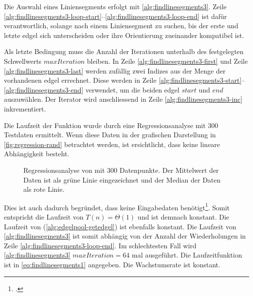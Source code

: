 Die Auswahl eines Liniensegments erfolgt mit \autoref{alg:findlinesegments3}. Zeile
 \ref{alg:findlinesegments3-loop-start}--\ref{alg:findlinesegments3-loop-end} ist dafür verantwortlich, solange nach
 einem Liniensegment zu suchen, bis der erste und letzte \gls{edgel} sich unterscheiden oder ihre Orientierung
 zueinander kompatibel ist.

Als letzte Bedingung muss die Anzahl der Iterationen unterhalb des festgelegten Schwellwerts $\mathit{maxIteration}$
 bleiben. In Zeile \ref{alg:findlinesegments3-first} und Zeile \ref{alg:findlinesegments3-last} werden zufällig zwei
 Indizes aus der Menge der vorhandenen \gls{edgel} errechnet. Diese werden in Zeile
 \ref{alg:findlinesegments3-start}--\ref{alg:findlinesegments3-end} verwendet, um die beiden \gls{edgel}
 $\mathit{start}$ und $\mathit{end}$ auszuwählen. Der Iterator wird anschliessend in Zeile
 \ref{alg:findlinesegments3-inc} inkrementiert.

Die Laufzeit der Funktion  wurde durch eine Regressionsanalyse mit $300$ Testdaten ermittelt. Wenn diese
 Daten in der grafischen Darstellung in \autoref{fig:regression-rand} betrachtet werden, ist ersichtlicht, dass keine
 lineare Abhängigkeit besteht.
\begin{figure}[!ht]
	\centering
	
	\caption{Regressionsanalyse von  mit $300$ Datenpunkte. Der Mittelwert der Daten ist als grüne Linie
	 eingezeichnet und der Median der Daten als rote Linie.}
	\label{fig:regression-rand}
\end{figure}
Dies ist auch dadurch begründet, dass  keine Eingabedaten benötigt\footcite[Vgl.][]{rand}. Somit
 entspricht die Laufzeit von  $T(n) = \Theta(1)$ und ist demnach konstant. Die Laufzeit von
  (\autoref{alg:edgelpool-getedgel}) ist ebenfalls konstant. Die Laufzeit von
 \autoref{alg:findlinesegments3} ist somit abhängig von der Anzahl der Wiederholungen in Zeile
 \ref{alg:findlinesegments3-loop-end}. Im schlechtesten Fall wird \autoref{alg:findlinesegments3}
 $\mathit{maxIteration} = 64$ mal ausgeführt. Die Laufzeitfunktion ist in \autoref{eq:findlinesegments1} angegeben. Die
 Wachstumsrate ist konstant.


